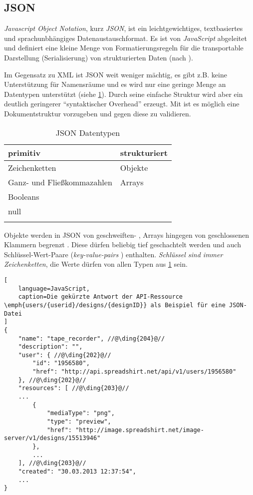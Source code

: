 \subsection{JSON}
\label{sec:json}

\begin{thesisDefinition}[JSON]
\emph{Javascript Object Notation}, kurz \emph{JSON}, ist ein leichtgewichtiges, textbasiertes und sprachunbhängiges Datenaustauschformat. Es ist von \emph{JavaScript} abgeleitet und definiert eine kleine Menge von Formatierungsregeln für die transportable Darstellung (Serialisierung) von strukturierten Daten (nach \cite{JSONRFC}).
\end{thesisDefinition}

Im Gegensatz zu XML ist JSON weit weniger mächtig, es gibt z.B. keine Unterstützung für Namensräume und es wird nur eine geringe Menge an Datentypen unterstützt (siehe \cref{tab:jsonDatatypes}). 
Durch seine einfache Struktur wird aber ein deutlich geringerer \enquote{syntaktischer Overhead} erzeugt.
Mit  ist es möglich eine Dokumentstruktur vorzugeben und gegen diese zu validieren. 

\begin{longtable}[tb]{l l}
    \toprule
    \rowcolor{lightgray}
    \textbf{primitiv}   & \textbf{strukturiert}\\
    \midrule
    Zeichenketten       & Objekte\\
    Ganz- und 
    Fließkommazahlen    & Arrays\\
    Booleans            & \\
    null                & \\
    \bottomrule
    \caption{JSON Datentypen}
    \label{tab:jsonDatatypes}
\end{longtable}

Objekte werden in JSON von geschweiften- , Arrays hingegen von geschlossenen Klammern begrenzt . Diese dürfen beliebig tief geschachtelt werden und auch Schlüssel-Wert-Paare (\emph{key-value-pairs} ) enthalten. \emph{Schlüssel sind immer Zeichenketten}, die Werte dürfen von allen Typen aus \cref{tab:jsonDatatypes} sein.
%
%
\begin{lstlisting}[
    language=JavaScript,
    caption=Die gekürzte Antwort der API-Ressource \emph{users/{userid}/designs/{designID}} als Beispiel für eine JSON-Datei
]
{
    "name": "tape_recorder", //@\ding{204}@//
    "description": "",
    "user": { //@\ding{202}@//
        "id": "1956580",
        "href": "http://api.spreadshirt.net/api/v1/users/1956580"
    }, //@\ding{202}@//
    "resources": [ //@\ding{203}@//
    ...
        {
            "mediaType": "png",
            "type": "preview",
            "href": "http://image.spreadshirt.net/image-server/v1/designs/15513946"
        }, 
        ...
    ], //@\ding{203}@//
    "created": "30.03.2013 12:37:54",
    ...
}
\end{lstlisting}    
